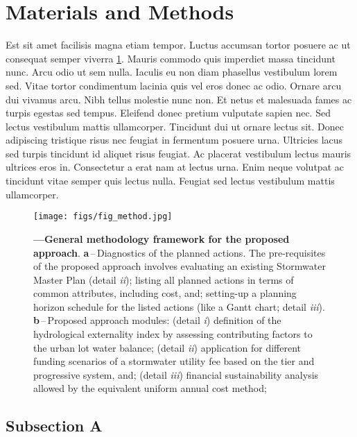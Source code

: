 \documentclass[11pt]{article}
\begin{document}
\section{Materials and Methods} \label{sec:methods}

\par Est sit amet facilisis magna etiam tempor. Luctus accumsan tortor posuere ac ut consequat semper viverra \ref{fig:fig}. Mauris commodo quis imperdiet massa tincidunt nunc. Arcu odio ut sem nulla. Iaculis eu non diam phasellus vestibulum lorem sed. Vitae tortor condimentum lacinia quis vel eros donec ac odio. Ornare arcu dui vivamus arcu. Nibh tellus molestie nunc non. Et netus et malesuada fames ac turpis egestas sed tempus. Eleifend donec pretium vulputate sapien nec. Sed lectus vestibulum mattis ullamcorper. Tincidunt dui ut ornare lectus sit. Donec adipiscing tristique risus nec feugiat in fermentum posuere urna. Ultricies lacus sed turpis tincidunt id aliquet risus feugiat. Ac placerat vestibulum lectus mauris ultrices eros in. Consectetur a erat nam at lectus urna. Enim neque volutpat ac tincidunt vitae semper quis lectus nulla. Feugiat sed lectus vestibulum mattis ullamcorper.

\begin{figure}[t!] %
	\centering                                       
	\texttt{[image: figs/fig\_method.jpg]}    
	\caption[General methodology framework]
	{ \textbf{---\;General methodology framework for the proposed approach}.
		\textbf{a}\,--\,Diagnostics of the planned actions. The pre-requisites of the proposed approach involves evaluating an existing Stormwater Master Plan (detail \textrm{\textit{ii}}); listing all planned actions in terms of common attributes, including cost, and; setting-up a planning horizon schedule for the listed actions (like a Gantt chart; detail \textrm{\textit{iii}}).
		\textbf{b}\,--\,Proposed approach modules: (detail \textrm{\textit{i}}) definition of the hydrological externality index by assessing contributing factors to the urban lot water balance; (detail \textrm{\textit{ii}}) application for different funding scenarios of a stormwater utility fee based on the tier and progressive system, and; (detail \textrm{\textit{iii}}) financial sustainability analysis allowed by the equivalent uniform annual cost method;		
	}
	\label{fig:fig}  %
\end{figure}

\subsection{Subsection A} \label{sec:suba}
\end{document}
